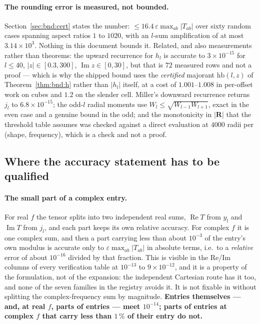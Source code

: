\paragraph{The rounding error is measured, not bounded.} Section~\ref{sec:bnd:cert} states
the number: $\le 16.4\,\varepsilon\max_{ab}|T_{ab}|$ over sixty random cases spanning aspect
ratios $1$ to $1020$, with an $l$-sum amplification of at most $3.14\times10^{3}$. Nothing
in this document bounds it. Related, and also measurements rather than theorems: the upward
recurrence for $h_l$ is accurate to $3\times10^{-15}$ for $l \le 40$,
$|z|\in[0.3,300]$, $\operatorname{Im}z\in[0,30]$, but that is $72$ measured rows and not a
proof --- which is why the shipped bound uses the \emph{certified} majorant
$\mathrm{hb}(l,z)$ of Theorem~\ref{thm:bnd:h} rather than $|h_l|$ itself, at a cost of
$1.001$--$1.008$ in per-offset work on cubes and $1.2$ on the slender cell. Miller's
downward recurrence returns $j_l$ to $6.8\times10^{-15}$; the odd-$l$ radial moments use
$W_l \le \sqrt{W_{l-1}W_{l+1}}$, exact in the even case and a genuine bound in the odd; and
the monotonicity in $|\mathbf{R}|$ that the threshold table assumes was checked against a
direct evaluation at $4000$ radii per (shape, frequency), which is a check and not a proof.

\subsection{Where the accuracy statement has to be qualified}

\paragraph{The small part of a complex entry.} For real $f$ the tensor splits into two
independent real sums, $\operatorname{Re}T$ from $y_l$ and $\operatorname{Im}T$ from $j_l$,
and each part keeps its own relative accuracy. For complex $f$ it is one complex sum, and
then a part carrying less than about $10^{-3}$ of the entry's own modulus is accurate only
to $\varepsilon\max_{ab}|T_{ab}|$ in absolute terms, i.e.\ to a \emph{relative} error of
about $10^{-16}$ divided by that fraction. This is visible in the Re/Im columns of every
verification table at $10^{-13}$ to $9\times10^{-12}$, and it is a property of the
formulation, not of the expansion: the independent Cartesian route has it too, and none of
the seven families in the registry avoids it. It is not fixable in  without
splitting the complex-frequency sum by magnitude. \textbf{Entries themselves --- and, at
real $f$, parts of entries --- meet $10^{-14}$; parts of entries at complex $f$ that carry
less than $1\,\%$ of their entry do not.}

